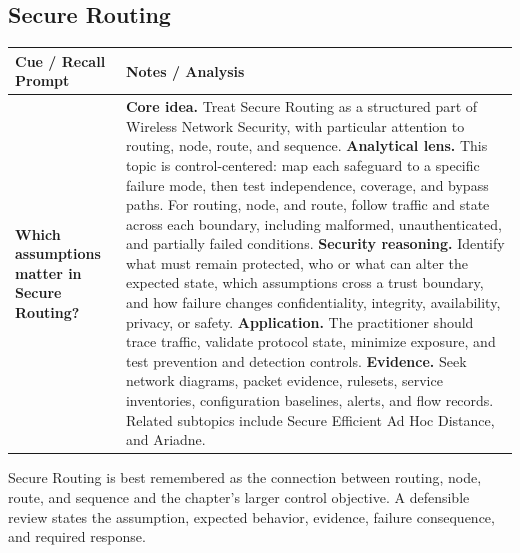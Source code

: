 \documentclass[11pt]{article}
\newcommand{\CornellHeader}{%
\rowcolor{Navy}\color{white}\bfseries Cue / Recall Prompt & \color{white}\bfseries Notes / Analysis\\\hline}
\newcommand{\CornellRow}[2]{%
\cellcolor{CueGray}\RaggedRight\textbf{#1} & \RaggedRight #2\\\hline}
\begin{document}
\subsection*{Secure Routing}
\begin{longtable}{>{\RaggedRight\arraybackslash}p{}|>{\RaggedRight\arraybackslash}p{}}
\CornellHeader
\CornellRow{Which assumptions matter in Secure Routing?}{\textbf{Core idea.} Treat Secure Routing as a structured part of Wireless Network Security, with particular attention to routing, node, route, and sequence. \textbf{Analytical lens.} This topic is control-centered: map each safeguard to a specific failure mode, then test independence, coverage, and bypass paths. For routing, node, and route, follow traffic and state across each boundary, including malformed, unauthenticated, and partially failed conditions. \textbf{Security reasoning.} Identify what must remain protected, who or what can alter the expected state, which assumptions cross a trust boundary, and how failure changes confidentiality, integrity, availability, privacy, or safety. \textbf{Application.} The practitioner should trace traffic, validate protocol state, minimize exposure, and test prevention and detection controls. \textbf{Evidence.} Seek network diagrams, packet evidence, rulesets, service inventories, configuration baselines, alerts, and flow records. Related subtopics include Secure Efficient Ad Hoc Distance, and Ariadne.}
\end{longtable}
\begin{topicsummary}
Secure Routing is best remembered as the connection between routing, node, route, and sequence and the chapter's larger control objective. A defensible review states the assumption, expected behavior, evidence, failure consequence, and required response.
\end{topicsummary}
\end{document}
